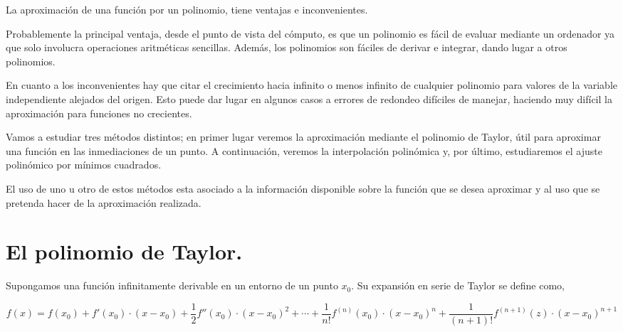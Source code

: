 \begin{paracol}{2}
La aproximación de una función por un polinomio, tiene ventajas e inconvenientes. 

Probablemente la principal ventaja, desde el punto de vista del cómputo, es que un polinomio es fácil de evaluar  mediante un ordenador ya que solo involucra operaciones aritméticas sencillas. Además, los polinomios son fáciles de derivar e integrar, dando lugar a otros polinomios.

En cuanto a los inconvenientes hay que citar el crecimiento hacia infinito o menos infinito de cualquier polinomio para valores de la variable independiente alejados del origen. Esto puede dar lugar en algunos casos a errores de redondeo difíciles de manejar, haciendo muy difícil la aproximación para funciones no crecientes.

Vamos a estudiar tres métodos distintos; en primer lugar veremos la aproximación mediante el polinomio de Taylor, útil para aproximar una función en las inmediaciones de un punto. A continuación,  veremos la interpolación polinómica y, por último, estudiaremos el ajuste polinómico por mínimos cuadrados.

El uso de uno u otro de estos métodos esta asociado a la información disponible sobre la función que se desea aproximar y al uso que se pretenda hacer de la aproximación realizada.


\section{El polinomio de Taylor.}

Supongamos una función infinitamente derivable en un entorno de un punto $x_0$. Su expansión en serie de Taylor se define como,
\end{paracol}
\begin{equation*}
f(x)=f(x_0)+f'(x_0)\cdot (x-x_0)+\frac{1}{2} f''(x_0)\cdot (x-x_0)^2+\cdots + \frac{1}{n!}f^{(n)}(x_0)\cdot (x-x_0)^n+ \frac{1}{(n+1)!}f^{(n+1)}(z)\cdot (x-x_0)^{n+1}
\end{equation*}

